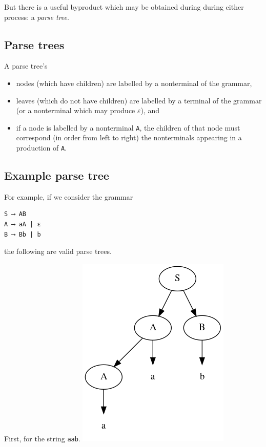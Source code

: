 \documentclass[11pt]{article}
\theoremstyle{definition}
\begin{document}
But there is a useful byproduct which may be obtained during
during either process: a \emph{parse tree}.

\subsection{Parse trees}
\label{sec:org4ecda68}

A parse tree's
\begin{itemize}
\item nodes (which have children) are
labelled by a nonterminal of the grammar,
\item leaves (which do not have children) are
labelled by a terminal of the grammar
(or a nonterminal which may produce \(ε\)), and
\item if a node is labelled by a nonterminal \texttt{A},
the children of that node must correspond
(in order from left to right)
the nonterminals appearing in a production of \texttt{A}.
\end{itemize}

\subsection{Example parse tree}
\label{sec:org877d176}

For example, if we consider the grammar
\begin{verbatim}
S ⟶ AB
A ⟶ aA | ε
B ⟶ Bb | b
\end{verbatim}
the following are valid parse trees.

First, for the string \texttt{aab}.
\includegraphics{media/parse-tree-example-aab.png}
\end{document}
